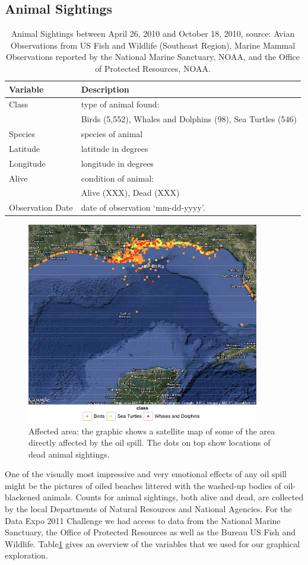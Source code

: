 \documentclass[authoryear,12pt]{elsarticle}
\begin{document}
\subsection{Animal Sightings}
\begin{table}
\begin{tabular}{lp{11cm}}
\bf Variable & \bf Description \\\hline
Class & type of animal found: \\
& {\small Birds (5,552),   Whales and Dolphins  (98),  Sea Turtles (546)}\\
Species & species of animal \\
Latitude & latitude in degrees  \\
Longitude & longitude in degrees\\
Alive & condition of animal: \\
& {\small Alive (XXX), Dead (XXX)} \\
Observation Date & date of observation `mm-dd-yyyy'. \\
\end{tabular}
\label{table.animal}
\caption{Animal Sightings between April 26, 2010 and October 18, 2010, source: Avian Observations from US Fish and Wildlife (Southeast Region),  Marine Mammal Observations reported by  the National Marine Sanctuary, NOAA, and the Office of Protected Resources, NOAA.}
\end{table}
\begin{figure}[htbp] %
   \centering
   \includegraphics[width=4in]{animal_deaths.png} 
   \caption{Affected area: the graphic shows a satellite map of some of the area directly affected by the oil spill. The dots on top show locations of dead animal sightings. }
   \label{deaths}
\end{figure}
One of the visually most impressive and very emotional effects of any oil spill might be the pictures of oiled beaches littered with the washed-up bodies of oil-blackened animals. Counts for animal sightings, both alive and dead, are collected by the local Departments of Natural Resources and National Agencies. For the Data Expo 2011 Challenge we had access to data from the National Marine Sanctuary, the Office of Protected Resources as well as the Bureau US Fish and Wildlife. Table\ref{table.animal} gives an overview of the variables that we used for our graphical exploration. 
\end{document}

